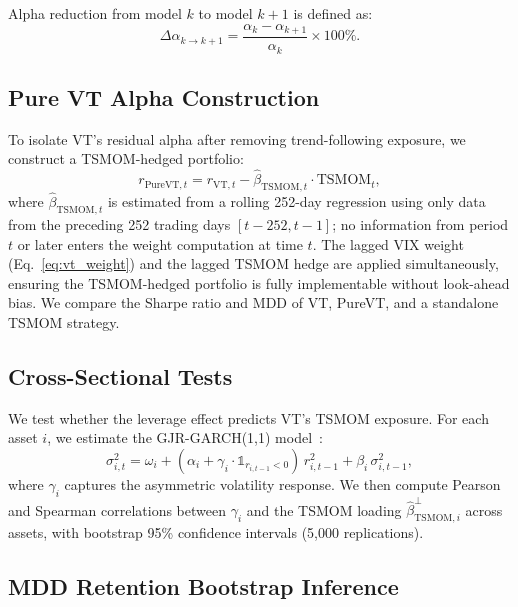 Alpha reduction from model $k$ to model $k+1$ is defined as:
\begin{equation}
\Delta\alpha_{k \to k+1} = \frac{\alpha_k - \alpha_{k+1}}{\alpha_k} \times 100\%.
\label{eq:alpha_reduction}
\end{equation}

\subsection{Pure VT Alpha Construction}

To isolate VT's residual alpha after removing trend-following exposure, we construct a TSMOM-hedged portfolio:
\begin{equation}
r_{\text{PureVT},t} = r_{\text{VT},t} - \hat{\beta}_{\text{TSMOM},t} \cdot \text{TSMOM}_t,
\label{eq:pure_vt}
\end{equation}
where $\hat{\beta}_{\text{TSMOM},t}$ is estimated from a rolling 252-day regression using only data from the preceding 252 trading days $[t-252, t-1]$; no information from period $t$ or later enters the weight computation at time $t$. The lagged VIX weight (Eq.~\ref{eq:vt_weight}) and the lagged TSMOM hedge are applied simultaneously, ensuring the TSMOM-hedged portfolio is fully implementable without look-ahead bias. We compare the Sharpe ratio and MDD of VT, PureVT, and a standalone TSMOM strategy.

\subsection{Cross-Sectional Tests}

We test whether the leverage effect predicts VT's TSMOM exposure. For each asset $i$, we estimate the GJR-GARCH(1,1) model~\citep{glosten1993}:
\begin{equation}
\sigma_{i,t}^2 = \omega_i + (\alpha_i + \gamma_i \cdot \mathbb{1}_{r_{i,t-1}<0}) \, r_{i,t-1}^2 + \beta_i \, \sigma_{i,t-1}^2,
\label{eq:gjr}
\end{equation}
where $\gamma_i$ captures the asymmetric volatility response. We then compute Pearson and Spearman correlations between $\gamma_i$ and the TSMOM loading $\hat{\beta}_{\text{TSMOM},i}^{\perp}$ across assets, with bootstrap 95\% confidence intervals (5,000 replications).

\subsection{MDD Retention Bootstrap Inference}

